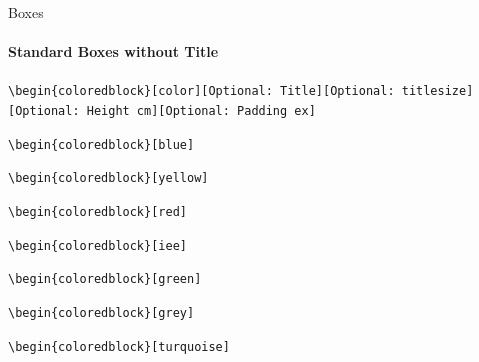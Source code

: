 \documentclass[aspectratio=169]{beamer}
\begin{document}
\begin{frame}{Boxes}
    \framesubtitle{Standard Boxes without Title}

    \footnotesize\centering\texttt{\textbackslash begin\{coloredblock\}[color][Optional:~Title][Optional:~titlesize][Optional:~Height cm][Optional:~Padding ex]}
    
    \begin{minipage}[t]{0.49\textwidth}

        \begin{coloredblock}[blue]
            \texttt{\textbackslash begin\{coloredblock\}[blue]}\strut
        \end{coloredblock}

        \begin{coloredblock}[yellow]
            \texttt{\textbackslash begin\{coloredblock\}[yellow]}\strut
        \end{coloredblock}

        \begin{coloredblock}[red]
            \texttt{\textbackslash begin\{coloredblock\}[red]}\strut
        \end{coloredblock}

    \end{minipage}
    \hfill
    \begin{minipage}[t]{0.49\textwidth}
        
        \begin{coloredblock}[iee]
            \texttt{\textbackslash begin\{coloredblock\}[iee]}\strut
        \end{coloredblock}

        \begin{coloredblock}[green]
            \texttt{\textbackslash begin\{coloredblock\}[green]}\strut
        \end{coloredblock}

        \begin{coloredblock}[grey]
            \texttt{\textbackslash begin\{coloredblock\}[grey]}\strut
        \end{coloredblock}
        
    \end{minipage}

    \centering
    \begin{minipage}[t]{0.49\textwidth}
        \begin{coloredblock}[turquoise]
                \texttt{\textbackslash begin\{coloredblock\}[turquoise]}\strut
        \end{coloredblock}
    \end{minipage}
\end{frame}
\end{document}
